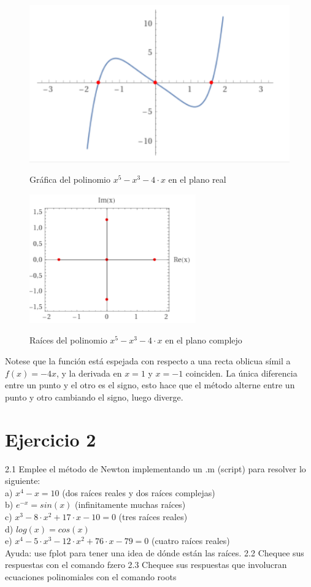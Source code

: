 \documentclass{article}
\begin{document}
\begin{figure}[H]
    \centering
    \includegraphics[width=0.7\linewidth]{Screenshot_20231111_154229.png}
    \label{fig:enter-label}
    \caption{Gráfica del polinomio $x^5-x^3-4 \cdot x$ en el plano real}
\end{figure}

\begin{figure}[H]
    \centering
    \includegraphics[width=0.3\linewidth]{Screenshot_20231111_154228.png}
    \label{fig:enter-label}
    \caption{Raíces del polinomio $x^5-x^3-4 \cdot x$ en el plano complejo}
\end{figure}

Notese que la función está espejada con respecto a una recta oblicua símil a $f(x)=-4x$, y la derivada en $x=1$ y $x=-1$ coinciden. La única diferencia entre un punto y el otro es el signo, esto hace que el método alterne entre un punto y otro cambiando el signo, luego diverge.  
\section{Ejercicio 2}
2.1 Emplee el método de Newton implementando un .m (script) para resolver lo siguiente:\\
a) $x^4 - x = 10$ (dos raíces reales y dos raíces complejas)\\
b) $e^{-x} = sin(x)$ (infinitamente muchas raíces)\\
c) $x^{3} - 8 \cdot x^2 + 17 \cdot x - 10 = 0$ (tres raíces reales)\\
d) $log(x) = cos(x)$\\
e) $x^{4} - 5 \cdot x^3 - 12 \cdot x^2 + 76 \cdot x - 79 = 0$ (cuatro raíces reales)\\
Ayuda: use fplot para tener una idea de dónde están las raíces.
2.2 Chequee sus respuestas con el comando fzero
2.3 Chequee sus respuestas que involucran ecuaciones polinomiales con el comando roots\\
\end{document}

